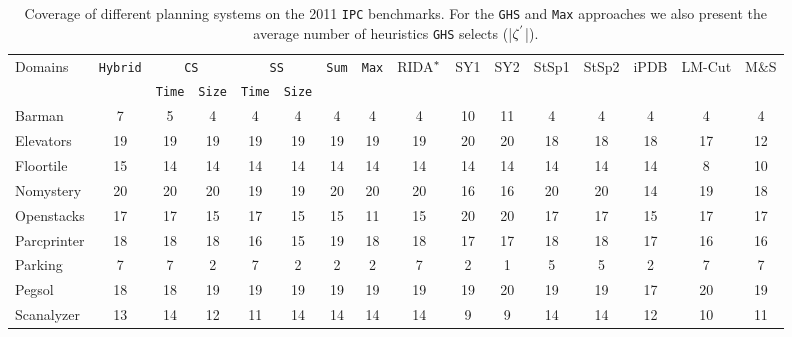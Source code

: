 \begin{table}[htb]
\tiny
\setlength{\tabcolsep}{1.8pt}
\centering
\caption{Coverage of different planning systems on the 2011 \texttt{IPC} benchmarks. For the \texttt{GHS} and \texttt{Max} approaches we also present the average number of heuristics \texttt{GHS} selects (|$\zeta\sp{'}$|).}
\begin{tabular}{lccccccccccccccc}
\hline
\multirow{2}{*}{Domains} & 
\multirow{2}{*}{\texttt{Hybrid}} & 
\multicolumn{2}{c}{\texttt{CS}} & 
\multicolumn{2}{c}{\texttt{SS}} & 
\multirow{2}{*}{\texttt{Sum}} & 
\multirow{2}{*}{\texttt{Max}} &
\multirow{2}{*}{RIDA$\sp{*}$} & 
\multirow{2}{*}{SY1} & 
\multirow{2}{*}{SY2} & 
\multirow{2}{*}{StSp1} & 
\multirow{2}{*}{StSp2} & 
\multirow{2}{*}{iPDB} & 
\multirow{2}{*}{LM-Cut} & 
\multirow{2}{*}{M$\&$S} \\ \cline{3-6}
                         &                                    & \texttt{Time} & \texttt{Size} & \texttt{Time} & \texttt{Size} &                                 &                       &                      &                      &                        &                        &                                 &                       &                         &                         \\ \hline
Barman&         7&      5&     4&    4&    4&    4&   4&    4&    10&  11&    4&    4&    4&     4&   4\\
Elevators&     19&     19&    19&   19&   19&   19&  19&   19&    20&  20&   18&   18&   18&    17&  12\\
Floortile&     15&     14&    14&   14&   14&   14&  14&   14&    14&  14&   14&   14&   14&     8&  10\\
Nomystery&     20&     20&    20&   19&   19&   20&  20&   20&    16&  16&   20&   20&   14&    19&  18\\
Openstacks&    17&     17&    15&   17&   15&   15&  11&   15&    20&  20&   17&   17&   15&    17&  17\\
Parcprinter&   18&     18&    18&   16&   15&   19&  18&   18&    17&  17&   18&   18&   17&    16&  16\\
Parking&        7&      7&     2&    7&    2&    2&   2&    7&     2&   1&    5&    5&    2&     7&   7\\
Pegsol&        18&     18&    19&   19&   19&   19&  19&   19&    19&  20&   19&   19&   17&    20&  19\\
Scanalyzer&    13&     14&    12&   11&   14&   14&  14&   14&     9&   9&   14&   14&   12&    10&  11\\

\end{tabular}
\end{table}
